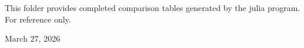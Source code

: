 This folder provides completed comparison tables generated by the julia program.
For reference only.

March 27, 2026
